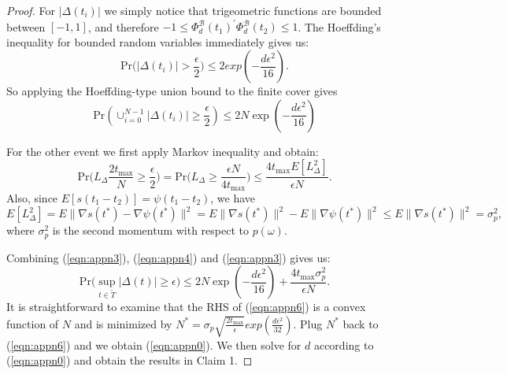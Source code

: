 \documentclass{article} %
\begin{document}
\begin{proof}
For $|\Delta(t_i)|$ we simply notice that trigeometric functions are bounded between $[-1,1]$, and therefore $-1 \leq \Phi^{\mathcal{B}}_d(t_1)^{'}\Phi^{\mathcal{B}}_d(t_2) \leq 1$. The Hoeffding's inequality for bounded random variables immediately gives us:
\begin{equation*}
    \text{Pr}\big(|\Delta(t_i)| > \frac{\epsilon}{2} \big) \leq 2exp(-\frac{d\epsilon^2}{16}).
\end{equation*}
So applying the Hoeffding-type union bound to the finite cover gives
\begin{equation}
\label{eqn:appn3}
    \text{Pr}(\cup_{i=0}^{N-1}|\Delta(t_i)| \geq \frac{\epsilon}{2}) \leq 2N\exp(-\frac{d\epsilon^2}{16})
\end{equation}

For the other event we first apply Markov inequality and obtain:
\begin{equation}
\label{eqn:appn4}
\text{Pr}\big(L_{\Delta}\frac{2t_{\max}}{N} \geq \frac{\epsilon}{2} \big) = \text{Pr}\big(L_{\Delta} \geq \frac{\epsilon N}{4t_{\max}} \big) \leq \frac{4t_{\max}E[L_{\Delta}^2]}{\epsilon N}.
\end{equation}
Also, since $E[s(t_1-t_2)] = \psi(t_1 - t_2)$, we have
\begin{equation}
\label{eqn:appn5}
E[L_{\Delta}^2] = E\|\nabla s(t^*) - \nabla \psi(t^*)\|^2 = E\|\nabla s(t^*)\|^2 - E\|\nabla \psi(t^*)\|^2 \leq E\|\nabla s(t^*)\|^2 = \sigma_p^2,
\end{equation}
where $\sigma_p^2$ is the second momentum with respect to $p(\omega)$.

Combining (\ref{eqn:appn3}), (\ref{eqn:appn4}) and (\ref{eqn:appn3}) gives us:
\begin{equation}
\label{eqn:appn6}
    \text{Pr}\big(\sup_{t \in \tilde{T}}|\Delta(t)| \geq \epsilon \big) \leq 2N\exp(-\frac{d\epsilon^2}{16}) + \frac{4t_{\max}\sigma_p^2}{\epsilon N}.
\end{equation}
It is straightforward to examine that the RHS of (\ref{eqn:appn6}) is a convex function of $N$ and is minimized by $N^* = \sigma_p \sqrt{\frac{2t_{\max}}{\epsilon}} exp(\frac{d \epsilon^2}{32})$. Plug $N^*$ back to (\ref{eqn:appn6}) and we obtain (\ref{eqn:appn0}). We then solve for $d$ according to (\ref{eqn:appn0}) and obtain the results in Claim 1.

\end{proof}


\end{document}
